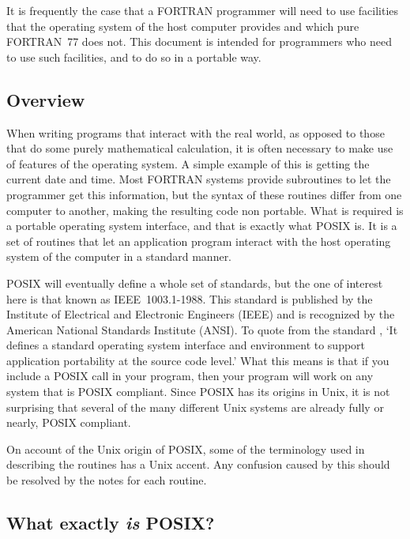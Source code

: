 \documentclass[twoside,11pt]{article}
\newcommand{\xlabel}[1]{}
\renewcommand{\_}{\texttt{\symbol{95}}}
\begin{document}
It is frequently the case that a FORTRAN programmer will need to use
facilities that the operating system of the host computer provides and
which pure FORTRAN~77 does not.  This document is intended for
programmers who need to use such facilities, and to do so in a portable
way.

\subsection{\xlabel{overview}Overview}

When writing programs that interact with the real world, as opposed to
those that do some purely mathematical calculation, it is often
necessary to make use of features of the operating system. A simple
example of this is getting the current date and time. Most FORTRAN
systems provide subroutines to let the programmer get this information,
but the syntax of these routines differ from one computer to another,
making the resulting code non portable. What is required
is a portable operating system interface, and that is exactly what
POSIX is. It is a set of routines that let an application program
interact with the host operating system of the computer in a standard
manner.

POSIX will eventually define a whole set of standards, but the one of
interest here is that known as IEEE~1003.1-1988. This standard is
published by the Institute of Electrical and Electronic Engineers
(IEEE) and is recognized by the American National Standards Institute
(ANSI). To quote from the standard \cite{psx:std}, `It defines a
standard operating system interface and environment to support
application portability at the source code level.' What this means is
that if you include a POSIX call in your program, then your program
will work on any system that is POSIX compliant. Since POSIX has its
origins in Unix, it is not surprising that several of the many
different Unix systems are already fully or nearly, POSIX compliant.

On account of the Unix origin of POSIX, some of the terminology used in
describing the routines has a Unix accent. Any confusion caused by this
should be resolved by the notes for each routine.

\subsection{\xlabel{what_exactly_is_posix}What exactly \emph{is} POSIX?}
\end{document}
